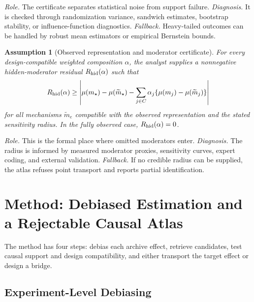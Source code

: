 \documentclass[11pt]{article}
\numberwithin{equation}{section}
\newtheorem{assumption}{Assumption}[section]
\newcommand{\1}{\mathbf 1}
\newcommand{\abs}[1]{\left\lvert #1\right\rvert}
\begin{document}
\emph{Role.}  The certificate separates statistical noise from support failure.  \emph{Diagnosis.}  It is checked through randomization variance, sandwich estimates, bootstrap stability, or influence-function diagnostics.  \emph{Fallback.}  Heavy-tailed outcomes can be handled by robust mean estimators or empirical Bernstein bounds.

\begin{assumption}[Observed representation and moderator certificate]
\label{ass:moderator}
For every design-compatible weighted composition \(\alpha\), the analyst supplies a nonnegative hidden-moderator residual \(R_{\rm hid}(\alpha)\) such that
\[
  R_{\rm hid}(\alpha)
  \ge
  \abs{
  \mu(m_\star)-\mu(\widetilde m_\star)
  -\sum_{j\in C}\alpha_j\{\mu(m_j)-\mu(\widetilde m_j)\}
  }
\]
for all mechanisms \(\widetilde m_e\) compatible with the observed representation and the stated sensitivity radius.  In the fully observed case, \(R_{\rm hid}(\alpha)=0\).
\end{assumption}

\emph{Role.}  This is the formal place where omitted moderators enter.  \emph{Diagnosis.}  The radius is informed by measured moderator proxies, sensitivity curves, expert coding, and external validation.  \emph{Fallback.}  If no credible radius can be supplied, the atlas refuses point transport and reports partial identification.

\section{Method: Debiased Estimation and a Rejectable Causal Atlas}
\label{sec:method}

The method has four steps: debias each archive effect, retrieve candidates, test causal support and design compatibility, and either transport the target effect or design a bridge.

\subsection{Experiment-Level Debiasing}
\end{document}
